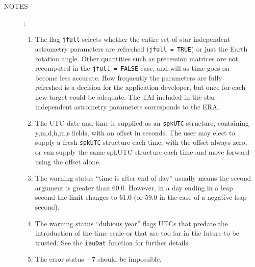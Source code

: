 \documentclass[11pt,fleqn,twoside,\paper]{article}
\renewcommand{\_}{{\tt\char'137}}     %
\newcommand{\notes}[1]
{
  \goodbreak
  \begin{description}
    \item[NOTES]: \nopagebreak
        #1
  \end{description}
  \vspace{-3ex}
}
\begin{document}
\notes{
\begin{enumerate}
\setlength{\parskip}{\medskipamount}
\item The flag {\tt jfull} selects whether the entire set of
      star-independent astrometry parameters are refreshed
      ({\tt jfull = TRUE}) or just the Earth rotation angle.  Other
      quantities such as precession matrices are not recomputed in
      the {\tt jfull = FALSE} case, and will as time goes on become
      less accurate.  How frequently the parameters are fully
      refreshed is a decision for the application developer, but once
      for each new target could be adequate.  The TAI included in the
      star-independent astrometry parameters corresponds to the ERA.
\item The UTC date and time is supplied as an {\tt spkUTC} structure,
      containing y,m,d,h,m,s fields, with an offset in seconds.  The
      user may elect to supply a fresh {\tt spkUTC} structure each time,
      with the offset always zero, or can supply the same spkUTC
      structure each time and move forward using the offset alone.
\item The warning status ``time is after end of day'' usually means
      the second argument is greater than 60.0.  However, in a day
      ending in a leap second the limit changes to 61.0 (or 59.0 in the
      case of a negative leap second).
\item The warning status ``dubious year'' flags UTCs that predate the
      introduction of the time scale or that are too far in the future
      to be trusted.  See the {\tt iauDat} function for further
      details.
\item The error status $-7$ should be impossible.
\end{enumerate}
}
\label{end_spkAstr}

\end{document}
